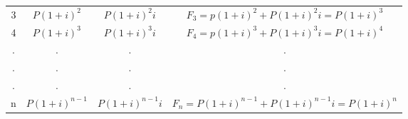 \begin{spacing}{1.5}
\begin{table}[H]
\begin{tabular}{@{}|c|c|c|c|@{}}
3                                                                        & $P(1+i)^2 $                                                         & $P(1+i)^{2}i $                                               & $F_3 = p(1+i)^{2}+P(1+i)^{2}i=P(1+i)^{3} $    \\
4                                                                        & $P(1+i)^{3}$                                                          & $P(1+i)^{3}i$                                                & $F_4 = p(1+i)^{3}+P(1+i)^{3}i=P(1+i)^{4}$\\
.                                                                         &       .                                                                            &   .                                                                       &                       .                                                                 \\
.                                                                         &       .                                                                            &   .                                                                       &                       .                                                                 \\
.                                                                         &       .                                                                            &   .                                                                       &                       .                                                                 \\
n                                                                        & $P(1+i)^{n-1}$                                                        & $P(1+i)^{n-1}i$                                              & $F_n = P(1+i)^{n-1}+P(1+i)^{n-1}i=P(1+i)^{n} $\\ \bottomrule
\end{tabular}
\end{table}


\end{spacing}
